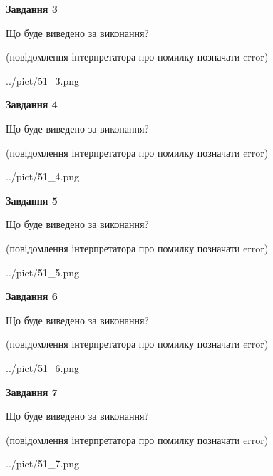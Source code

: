 \documentclass[12pt, ukrainian]{article}
\begin{document}
{\begin {large}
{\begin {center}\textbf{Завдання 3}\end {center}}\par
Що буде виведено за виконання?\par
 (повідомлення інтерпретатора про помилку позначати error)\par
\begin{center}
	{../pict/51_3.png}
\end{center}
\newpage

{\begin {center}\textbf{Завдання 4}\end {center}}\par
Що буде виведено за виконання?\par
 (повідомлення інтерпретатора про помилку позначати error)\par
\begin{center}
	{../pict/51_4.png}
\end{center}
\newpage

{\begin {center}\textbf{Завдання 5}\end {center}}\par
Що буде виведено за виконання?\par
 (повідомлення інтерпретатора про помилку позначати error)\par
\begin{center}
	{../pict/51_5.png}
\end{center}
\newpage

{\begin {center}\textbf{Завдання 6}\end {center}}\par
Що буде виведено за виконання?\par
 (повідомлення інтерпретатора про помилку позначати error)\par
\begin{center}
	{../pict/51_6.png}
\end{center}
\newpage

{\begin {center}\textbf{Завдання 7}\end {center}}\par
Що буде виведено за виконання?\par
 (повідомлення інтерпретатора про помилку позначати error)\par
\begin{center}
	{../pict/51_7.png}
\end{center}
\newpage


\end{large}}
\end{document}
